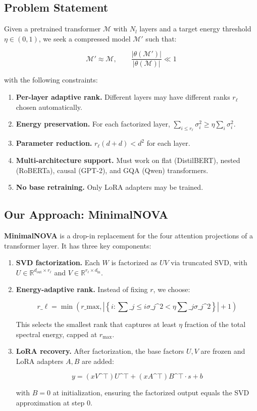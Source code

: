 \subsection{Problem Statement}

Given a pretrained transformer $\mathcal{M}$ with $N_l$ layers and a target 
energy threshold $\eta \in (0, 1)$, we seek a compressed model $\mathcal{M}'$ 
such that:

\[
\mathcal{M}' \approx \mathcal{M}, \qquad
\frac{|\theta(\mathcal{M}')|}{|\theta(\mathcal{M})|} \ll 1
\tag{1.3}
\]

with the following constraints:

\begin{enumerate}
\item \textbf{Per-layer adaptive rank.} Different layers may have different ranks
  $r_\ell$ chosen automatically.
\item \textbf{Energy preservation.} For each factorized layer,
  $\sum_{i \leq r_\ell} \sigma_i^2 \geq \eta \sum_i \sigma_i^2$.
\item \textbf{Parameter reduction.} $r_\ell (d + d) < d^2$ for each layer.
\item \textbf{Multi-architecture support.} Must work on flat (DistilBERT), nested
  (RoBERTa), causal (GPT-2), and GQA (Qwen) transformers.
\item \textbf{No base retraining.} Only LoRA adapters may be trained.

\end{enumerate}
\subsection{Our Approach: MinimalNOVA}

\textbf{MinimalNOVA} is a drop-in replacement for the four attention projections 
of a transformer layer. It has three key components:

\begin{enumerate}
\item \textbf{SVD factorization.} Each $W$ is factorized as $U V$ via truncated SVD,
  with $U \in \mathbb{R}^{d_\text{out} \times r_\ell}$ and
  $V \in \mathbb{R}^{r_\ell \times d_\text{in}}$.

\item \textbf{Energy-adaptive rank.} Instead of fixing $r$, we choose:

  $$
  r\_\ell = \min\!\left(r\_\text{max}, \left|\left\{i : \sum\_{j \leq i} \sigma\_j\^{}2 < \eta \sum\_j \sigma\_j\^{}2\right\}\right| + 1\right)
  \tag{1.4}
  $$

  This selects the smallest rank that captures at least $\eta$ fraction of
  the total spectral energy, capped at $r_\text{max}$.

\item \textbf{LoRA recovery.} After factorization, the base factors $U, V$ are
  frozen and LoRA adapters $A, B$ are added:

  $$
  y = (x V\^{}\top) U\^{}\top + (x A\^{}\top) B\^{}\top \cdot s + b
  \tag{1.5}
  $$

  with $B = 0$ at initialization, ensuring the factorized output equals
  the SVD approximation at step 0.

\end{enumerate}
